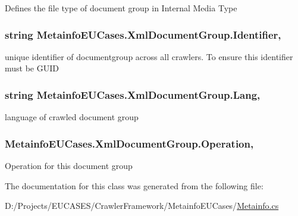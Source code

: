 Defines the file type of document group in Internal Media Type 

\hypertarget{class_metainfo_e_u_cases_1_1_xml_document_group_ae35a0c0f53de8daeb10ddb6d6a70cb49}{
\subsubsection[{Identifier}]{\setlength{\rightskip}{0pt plus 5cm}string Metainfo\-E\-U\-Cases.\-Xml\-Document\-Group.\-Identifier\hspace{0.3cm}{\ttfamily [get]}, {\ttfamily [set]}}}\label{class_metainfo_e_u_cases_1_1_xml_document_group_ae35a0c0f53de8daeb10ddb6d6a70cb49}


unique identifier of documentgroup across all crawlers. To ensure this identifier must be G\-U\-I\-D 

\hypertarget{class_metainfo_e_u_cases_1_1_xml_document_group_afdd8814f77d7ed75f13cd1f6a0998101}{
\subsubsection[{Lang}]{\setlength{\rightskip}{0pt plus 5cm}string Metainfo\-E\-U\-Cases.\-Xml\-Document\-Group.\-Lang\hspace{0.3cm}{\ttfamily [get]}, {\ttfamily [set]}}}\label{class_metainfo_e_u_cases_1_1_xml_document_group_afdd8814f77d7ed75f13cd1f6a0998101}


language of crawled document group 

\hypertarget{class_metainfo_e_u_cases_1_1_xml_document_group_ab2ccda383cf6a14bfae6d47b182737bb}{
\subsubsection[{Operation}]{ Metainfo\-E\-U\-Cases.\-Xml\-Document\-Group.\-Operation\hspace{0.3cm}{\ttfamily [get]}, {\ttfamily [set]}}}\label{class_metainfo_e_u_cases_1_1_xml_document_group_ab2ccda383cf6a14bfae6d47b182737bb}


Operation for this document group 



The documentation for this class was generated from the following file\-:\begin{DoxyCompactItemize}
\item 
D\-:/\-Projects/\-E\-U\-C\-A\-S\-E\-S/\-Crawler\-Framework/\-Metainfo\-E\-U\-Cases/\hyperlink{_metainfo_8cs}{Metainfo.\-cs}\end{DoxyCompactItemize}
